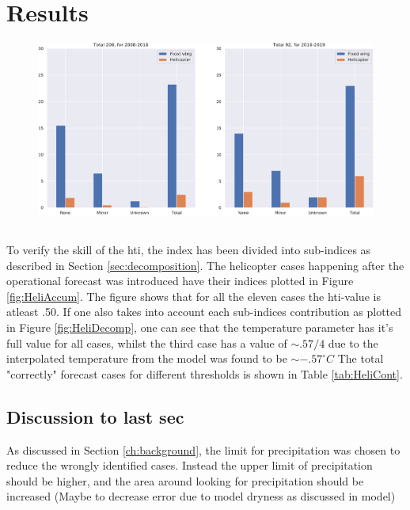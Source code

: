 \chapter{Results}

\begin{figure}[H]
    \centering
    \includegraphics[width=\textwidth]{Figures/Casesperyear.pdf}
    \caption{}
    \label{fig:casesperyear}
\end{figure}

\section{}
To verify the skill of the \acrshort{hti}, the index has been divided into sub-indices as described in Section \ref{sec:decomposition}. The helicopter cases happening after the operational forecast was introduced have their indices plotted in Figure \ref{fig:HeliAccum}. The figure shows that for all the eleven cases the \acrshort{hti}-value is atleast .50. If one also takes into account each sub-indices contribution as plotted in Figure \ref{fig:HeliDecomp}, one can see that the temperature parameter has it's full value for all cases, whilst the third case has a value of  $\sim .57/4$ due to the interpolated temperature from the model was found to be  $\sim -.57 ^{\circ}C$
The total "correctly" forecast cases for different thresholds is shown in Table \ref{tab:HeliCont}. 

\section{Discussion to last sec}
As discussed in Section \ref{ch:background}, the limit for precipitation was chosen to reduce the wrongly identified cases. Instead the upper limit of precipitation should be higher, and the area around looking for precipitation should be increased (Maybe to decrease error due to model dryness as discussed in model)

